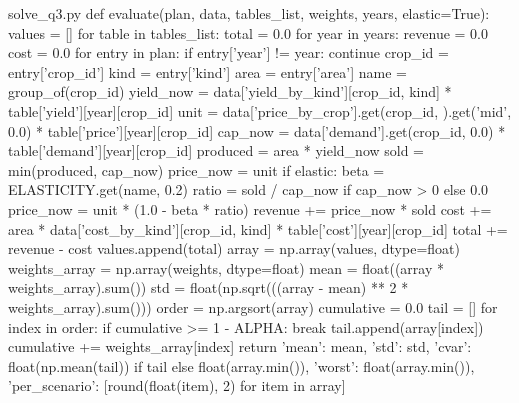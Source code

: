 \documentclass[bwprint]{gmcmthesis}
\begin{document}
\begin{appendices}
\begin{Python}{solve\_q3.py}
def evaluate(plan, data, tables_list, weights, years, elastic=True):
    values = []
    for table in tables_list:
        total = 0.0
        for year in years:
            revenue = 0.0
            cost = 0.0
            for entry in plan:
                if entry['year'] != year:
                    continue
                crop_id = entry['crop_id']
                kind = entry['kind']
                area = entry['area']
                name = group_of(crop_id)
                yield_now = data['yield_by_kind'][crop_id, kind] * table['yield'][year][crop_id]
                unit = data['price_by_crop'].get(crop_id, {}).get('mid', 0.0) * table['price'][year][crop_id]
                cap_now = data['demand'].get(crop_id, 0.0) * table['demand'][year][crop_id]
                produced = area * yield_now
                sold = min(produced, cap_now)
                price_now = unit
                if elastic:
                    beta = ELASTICITY.get(name, 0.2)
                    ratio = sold / cap_now if cap_now > 0 else 0.0
                    price_now = unit * (1.0 - beta * ratio)
                revenue += price_now * sold
                cost += area * data['cost_by_kind'][crop_id, kind] * table['cost'][year][crop_id]
            total += revenue - cost
        values.append(total)
    array = np.array(values, dtype=float)
    weights_array = np.array(weights, dtype=float)
    mean = float((array * weights_array).sum())
    std = float(np.sqrt(((array - mean) ** 2 * weights_array).sum()))
    order = np.argsort(array)
    cumulative = 0.0
    tail = []
    for index in order:
        if cumulative >= 1 - ALPHA:
            break
        tail.append(array[index])
        cumulative += weights_array[index]
    return {'mean': mean, 'std': std, 'cvar': float(np.mean(tail)) if tail else float(array.min()), 'worst': float(array.min()), 'per_scenario': [round(float(item), 2) for item in array]}


\end{Python}
\end{appendices}
\end{document}
